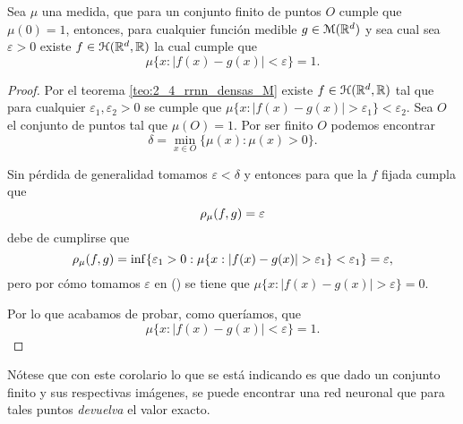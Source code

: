 \begin{corolario} \label{corolario:2_4_conjunto_finito}
    Sea $\mu$ una medida, que para
    un conjunto finito de puntos $O$ cumple que $\mu(0)=1$, 
    entonces, para cualquier función medible $g \in \mathcal{M}(\mathbb{R}^d)$
    y sea cual sea $\varepsilon >0$ 
    existe $f \in \mathcal{H}(\mathbb{R}^d,\mathbb{R})$ la cual cumple que 
    \begin{equation}
        \mu\{ 
            x:
            |f(x) - g(x)| 
            < \varepsilon
        \}
        = 1.
    \end{equation}

\end{corolario}
\begin{proof}
    Por el teorema \ref{teo:2_4_rrnn_densas_M} existe 
    $f \in \mathcal{H}(\mathbb{R}^d,\mathbb{R})$ tal que para cualquier 
    $\varepsilon_1, \varepsilon_2 >0$ se cumple que 
    $\mu \{x: |f(x) - g(x)| > \varepsilon_1\} < \varepsilon_2.$
    Sea $O$ el conjunto de puntos tal que $\mu(O) = 1.$
    Por ser finito $O$ podemos encontrar
    \begin{equation} \label{eq:2_4:definición_epsilon}
        \delta = \min_{x \in O} \{ 
            \mu(x) : \mu(x)>0
        \}. 
    \end{equation}

    Sin pérdida de generalidad tomamos $\varepsilon < \delta$ y entonces
    para  que la $f$ fijada cumpla que
    \begin{equation}
        \rho_{\mu}(f,g) = \varepsilon
    \end{equation}
    debe de cumplirse que 
    \begin{equation}
        \rho_{\mu}(f,g) =  \inf 
        \{
           \varepsilon_1 > 0:
           \mu\{ 
            x:
            |f(x) - g(x)| 
            > \varepsilon_1
        \}
        < \varepsilon_1
        \} 
        = \varepsilon,
    \end{equation}
    pero por cómo tomamos $\varepsilon$ en () se
    tiene que $\mu\{ 
        x:
        |f(x) - g(x)| 
        > \varepsilon
    \} = 0.$

    Por lo que acabamos de probar, como queríamos, que 
    \begin{equation}
        \mu\{ 
            x:
            |f(x) - g(x)| 
            < \varepsilon
        \}
        = 1.
    \end{equation}
\end{proof}

Nótese que con este corolario lo que se está indicando es que dado
un conjunto finito y sus respectivas imágenes, se puede encontrar una red neuronal que para tales puntos \textit{devuelva} el valor exacto. 

